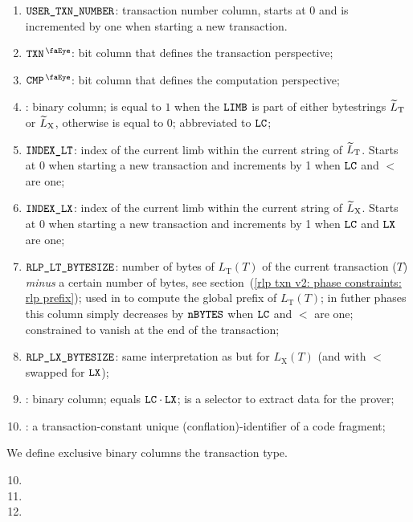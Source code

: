 \begin{enumerate}
    \item $\texttt{USER}\texttt{\_}\texttt{TXN\_NUMBER}$:
	transaction number column, starts at 0 and is incremented by one when starting a new transaction.
    \item $\isTxn$:
	bit column that defines the transaction perspective;
    \item $\isCmp$:
	bit column that defines the computation perspective;
    \item {}:
	binary column;
	is equal to $1$ when the $\texttt{LIMB}$ is part of either \rlp{} bytestrings $\widetilde{L}_{\mathrm{T}}$ or $\widetilde{L}_{\mathrm{X}}$, otherwise is equal to $0$;
	abbreviated to $\texttt{LC}$;
    \item $\texttt{INDEX\_LT}$:
	index of the current limb within the current string of $\widetilde{L}_{\mathrm{T}}$. Starts at 0 when starting a new transaction and increments by 1 when $\texttt{LC}$ and $\lt$ are one; 
    \item $\texttt{INDEX\_LX}$:                                                       
	index of the current limb within the current string of $\widetilde{L}_{\mathrm{X}}$. Starts at 0 when starting a new transaction and increments by 1 when $\texttt{LC}$ and $\texttt{LX}$ are one;
    \item $\texttt{RLP\_LT\_BYTESIZE}$:
	number of bytes of $L_{\mathrm{T}}(T)$ of the current transaction ($T$) \emph{minus} a certain number of bytes,
	see section~(\ref{rlp txn v2: phase constraints: rlp prefix});
	used in \phaseRlpPrefix{} to compute the global \rlp{} prefix of $L_{\mathrm{T}}(T)$;
	in futher phases this column simply decreases by $\texttt{nBYTES}$ when $\texttt{LC}$ and $\lt$ are one;
	constrained to vanish at the end of the transaction;
    \item $\texttt{RLP\_LX\_BYTESIZE}$:
	same interpretation as \rlptsize{} but for $L_{\mathrm{X}}(T)$
	(and with $\lt$ swapped for $\texttt{LX}$);
    \item \toHashByProver{}:
	binary column; equals $\texttt{LC} \cdot \texttt{LX}$; is a selector to extract data for the prover;
	\item \CFI{}:
	a transaction-constant unique (conflation)-identifier of a code fragment;
\end{enumerate}
We define exclusive binary columns the transaction type.
\begin{multicols}{3}
    \begin{enumerate}
	\setcounter{enumi}{9}
	\item \typeZeroTx{}
	\item \typeOneTx{}
	\item \typeTwoTx{}
    \end{enumerate}
\end{multicols}
